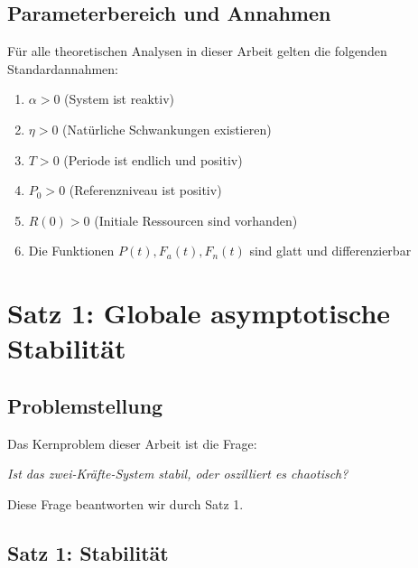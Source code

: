 \documentclass[a4paper, 12pt, twoside, openright]{report}
\theoremstyle{definition}
\theoremstyle{definition}
\begin{document}
\subsection{Parameterbereich und Annahmen}

Für alle theoretischen Analysen in dieser Arbeit gelten die folgenden Standardannahmen:

\begin{enumerate}
    \item $\alpha > 0$ (System ist reaktiv)
    \item $\eta > 0$ (Natürliche Schwankungen existieren)
    \item $T > 0$ (Periode ist endlich und positiv)
    \item $P_0 > 0$ (Referenzniveau ist positiv)
    \item $R(0) > 0$ (Initiale Ressourcen sind vorhanden)
    \item Die Funktionen $P(t), F_a(t), F_n(t)$ sind glatt und differenzierbar
\end{enumerate}

\section{Satz 1: Globale asymptotische Stabilität}

\subsection{Problemstellung}

Das Kernproblem dieser Arbeit ist die Frage:

\begin{center}
    \textit{Ist das zwei-Kräfte-System stabil, oder oszilliert es chaotisch?}
\end{center}

Diese Frage beantworten wir durch Satz 1.

\subsection{Satz 1: Stabilität}
\end{document}
